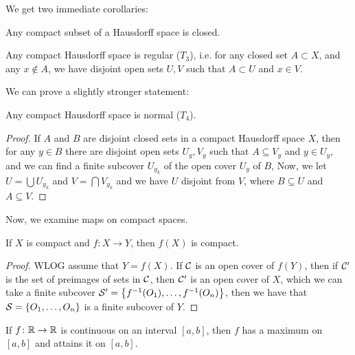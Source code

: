 We get two immediate corollaries:

\begin{corollary}
    \label{prop:compsuboft2closed}
    Any compact subset of a Hausdorff space is closed.
\end{corollary}

\begin{corollary}
    Any compact Hausdorff space is regular ($T_3$), i.e. for any closed set $A \subset X$, and any $x \notin A$, we have disjoint open sets $U, V$ such that $A \subset U$ and $x \in V$.
\end{corollary}

We can prove a slightly stronger statement: 

\begin{corollary}
    Any compact Hausdorff space is normal ($T_4$).
\end{corollary}

\begin{proof}
    If $A$ and $B$ are disjoint closed sets in a compact Hausdorff space $X$, then for any $y \in B$ there are disjoint open sets $U_y, V_y$ such that $A \subseteq V_y$ and $y \in U_y$, and we can find a finite subcover $U_{y_k}$ of the open cover $U_y$ of $B$, Now, we let $U = \bigcup U_{y_k}$ and $V = \bigcap V_{y_k}$ and we have $U$ disjoint from $V$, where $B \subseteq U$ and $A \subseteq V$. 
\end{proof}

Now, we examine maps on compact spaces.

\begin{proposition}
    \label{prop:imcompiscomp}
    If $X$ is compact and $f \colon X \to Y$, then $f(X)$ is compact.
\end{proposition}

\begin{proof}
    WLOG assume that $Y = f(X)$. If $\mathcal C$ is an open cover of $f(Y)$, then if $\mathcal C'$ is the set of preimages of sets in $\mathcal C$, then $\mathcal C'$ is an open cover of $X$, which we can take a finite subcover $\mathcal S' = \qty{f^{-1}(O_1), \dots, f^{-1}(O_n)}$, then we have that $\mathcal S = \qty{O_1, \dots, O_n}$ is a finite subcover of $Y$. 
\end{proof}

\begin{corollary}
    If $f \colon \mathbb R \to \mathbb R$ is continuous on an interval $[a, b]$, then $f$ has a maximum on $[a, b]$ and attains it on $[a, b]$. 
\end{corollary}

